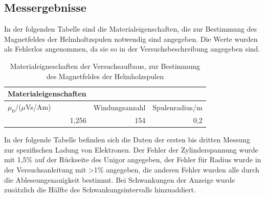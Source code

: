 \documentclass[12pt,a4paper]{article}
\begin{document}
\subsection{Messergebnisse}

In der folgenden Tabelle sind die Materialeigenschaften, die zur Bestimmung des Magnetfeldes der Helmholtzspulen notwendig sind angegeben. Die Werte wurden als Fehlerlos angenommen, da sie so in der Versuchsbeschreibung angegeben sind.

\begin{table}[H]
\caption{Materialeigneschaften der Versuchsaufbaus, zur Bestimmung des Magnetfeldes der Helmholzspulen}
\begin{center}
\begin{tabular}{|l|l|l|}
\hline
Materialeigenschaften &  &  \\ \hline
$\mu_0$/($\mu$Vs/Am) & Windungsanzahl & Spulenradius/m \\ \hline
\multicolumn{1}{|r|}{1,256} & \multicolumn{1}{r|}{154} & \multicolumn{1}{r|}{0,2} \\ \hline
\end{tabular}
\end{center}
\label{tab:1_m}
\end{table}

In der folgende Tabelle befinden sich die Daten der ersten bis dritten Messung zur spezifischen Ladung von Elektronen. Der Fehler der Zylinderspannung wurde mit 1,5\% auf der Rückseite des Unigor angegeben, der Fehler für Radius wurde in der Versuchsanleitung mit >1\% angegeben, die anderen Fehler wurden alle durch die Ableseungenauigkeit bestimmt. Bei Schwankungen der Anzeige wurde zusätzlich die Hälfte des Schwankungsintervalls hinzuaddiert.
\end{document}
